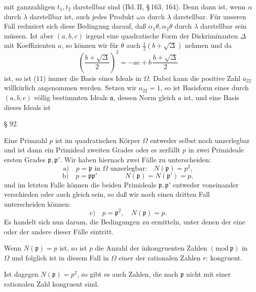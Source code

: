 mit ganzzahligen $t_1, t_2$ darstellbar sind (Bd.\,II, §\,163, 164). Denn
dann ist, wenn $\alpha$ durch $\lambda$ darstellbar ist, auch jedes Produkt $\omega\alpha$
durch $\lambda$ darstellbar. Für unseren Fall reduziert sich diese Bedingung darauf, daß $\alpha_1\theta, \alpha_2\theta$ durch $\lambda$ darstellbar sein müssen. Ist
aber $(a, b, c)$ irgend eine quadratische Form der Diskriminanten $\Delta$
mit  Koeffizienten $a$, so können wir für $\theta$ auch
$\tfrac12(b+\sqrt{\Delta})$ nehmen und da
\[
\left(\frac{b+\sqrt{\Delta}}{2}\right)^2 = -ac + b\,\frac{b+\sqrt{\Delta}}{2}
\]
ist, so ist (11) immer die Basis eines Ideals in $\Omega$. Dabei kann
die positive Zahl $a_{22}$ willkürlich angenommen werden. Setzen wir
$a_{22} = 1$, so ist
Basisform eines durch $(a, b, c)$ völlig bestimmten Ideals $\mathfrak{a}$, dessen
Norm gleich $a$ ist, und eine Basis dieses Ideals ist

\begin{center}
§ 92. 
\end{center}

Eine Primzahl $p$ ist im quadratischen Körper $\Omega$ entweder
selbst noch unzerlegbar und ist dann ein Primideal zweiten
Grades oder es zerfällt $p$ in zwei Primideale ersten Grades $\mathfrak{p}, \mathfrak{p}'$.
Wir haben hiernach zwei Fälle zu unterscheiden:
\[
\text{a)}\quad p = \mathfrak{p} \text{ in } \Omega \text{ unzerlegbar:}\quad N(\mathfrak{p}) = p^2,
\]
\[
\text{b)}\quad p = \mathfrak{p}\mathfrak{p}' \qquad\qquad N(\mathfrak{p}) = N(\mathfrak{p}') = p,
\]
und im letzten Falle können die beiden Primideale $\mathfrak{p}, \mathfrak{p}'$ entweder
voneinander verschieden oder auch gleich sein, so daß wir noch
einen dritten Fall unterscheiden können:
\[
\text{c)}\quad p = \mathfrak{p}^2,\quad N(\mathfrak{p}) = p.
\]
Es handelt sich nun darum, die Bedingungen zu ermitteln,
unter denen der eine oder der andere dieser Fälle eintritt.

Wenn $N(\mathfrak{p}) = p$ ist, so ist $p$ die Anzahl der inkongruenten
Zahlen $(\mathrm{mod}\ \mathfrak{p})$ in $\Omega$ und folglich ist in diesem Fall 
in $\Omega$ einer der rationalen Zahlen $r$:
kongruent.

Ist dagegen $N(\mathfrak{p}) = p^2$, so gibt es auch Zahlen, die nach $\mathfrak{p}$
nicht mit einer rationalen Zahl kongruent sind.
